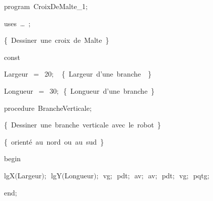 
{
\parindent {}
\medskip

\carrenoir
\vspace{\neglskip}\mbox{\blc  \idt  \mcl program\idt\ CroixDeMalte\_1$;$
}\par 
\vspace{\neglskip}\mbox{\blc \blk\idt \mcl uses\idt \ \ldots\ $;$
}\par 
\vspace{\neglskip}\mbox{\blc  \idt  \cmt  \{\ Dessiner\ une\ croix\ de\ Malte\ \}\idt }\par 
\medskip

\pagebreak[3] 
\vspace{\neglskip}\mbox{\blc  \blk\idt  \mcl const\idt }\par 
\vspace{\neglskip}\mbox{\blc  \blk\blk\idt  Largeur\ $=$\ 20$;$\ \ \cmt  \{\ Largeur\ d{'}une\ branche\ \ \}\idt }\par 
\vspace{\neglskip}\mbox{\blc  \blk\blk\idt  Longueur\ $=$\ 30$;$\ \cmt  \{\ Longueur\ d{'}une\ branche\ \}\idt }\par 
\medskip

\pagebreak[3] 
\vspace{\neglskip}\mbox{\blc  \blk\idt  \mcl procedure\idt \ BrancheVerticale$;$}\par 
\vspace{\neglskip}\mbox{\blc  \blk\blk\idt  \cmt  \{\ Dessiner\ une\ branche\ verticale\ avec\ le\ robot\ \}\idt }\par 
\vspace{\neglskip}\mbox{\blc  \blk\blk\idt  \cmt  \{\ orienté\ au\ nord\ ou\ au\ sud\ \}\idt }\par 
\vspace{\neglskip}\mbox{\blc  \blk\idt  \mcl begin\idt }\par 
\vspace{\neglskip}\mbox{\blc  \blk\blk\idt  lgX$($Largeur$)$$;$\ lgY$($Longueur$)$$;$\ vg$;$\ pdt$;$\ av$;$\ av$;$\ pdt$;$\ vg$;$\ pqtg$;$}\par 
\vspace{\neglskip}\mbox{\blc  \blk\idt  \mcl end\idt $;$}\par 
\medskip

}
